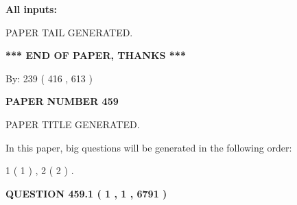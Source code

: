 \documentclass{ctexart}
\begin{document}
   
   
   
\noindent{}
   
   
   
   
\noindent\vspace{0.1in}\hspace{-0.08in} {\textbf{\Large{All inputs: }}}
   
   
   
   
   
   
 \vspace{0.2in}
 
   
   
\vspace{2.0in} PAPER TAIL GENERATED.
   
   
   
   
\vspace{1.0in} 
{\textbf{\large{ *** END OF PAPER, THANKS *** }}} 
   
   
\hspace{1.0in} By: 
 239 ( 416 ,  613 )
   
   
   
   
\newpage 
\setcounter{page}{ 
   459001 } 
   
   
   
   
 {\textbf{ \Large{ PAPER NUMBER  459  }}}
   
   
\vspace{0.2in}
   
   
   
   
   
   
   
   
 \vspace{0.2in}
 
 
 
 
   
   
 PAPER TITLE GENERATED.
   
   
   
\vspace{0.2in}
   
In this paper, big questions will be generated in the following order: 
   
   
   1 ( 1 )
 ,
   2 ( 2 )
 .
  
\vspace{0.2in}
  
{\textbf{\Large{QUESTION
459.1 
 ( 1 , 1 , 6791 )
}}}
  
\end{document}
